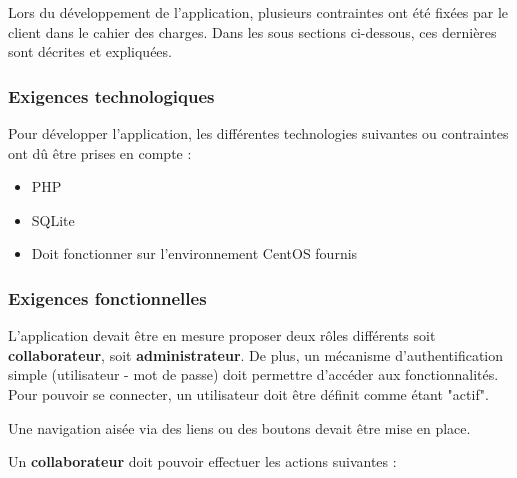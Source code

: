 \documentclass[12pt]{article}
\begin{document}
Lors du développement de l'application, plusieurs contraintes ont été fixées par le client dans le cahier des charges. Dans les sous sections ci-dessous, ces dernières sont décrites et expliquées. 

\subsubsection{Exigences technologiques}
Pour développer l'application, les différentes technologies suivantes ou contraintes ont dû être prises en compte :

\begin{itemize}
\item PHP
\item SQLite
\item Doit fonctionner sur l'environnement CentOS fournis
\end{itemize}

\subsubsection{Exigences fonctionnelles}

L'application devait être en mesure proposer deux rôles différents soit \textbf{collaborateur}, soit \textbf{administrateur}. De plus, un mécanisme d'authentification simple (utilisateur - mot de passe) doit permettre d'accéder aux fonctionnalités. Pour pouvoir se connecter, un utilisateur doit être définit comme étant "actif".

Une navigation aisée via des liens ou des boutons devait être mise en place.

\newpage
Un \textbf{collaborateur} doit pouvoir effectuer les actions suivantes : 
\end{document}

